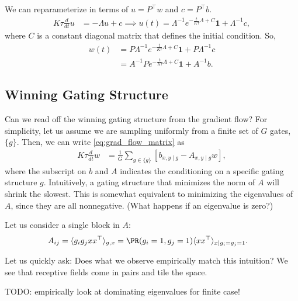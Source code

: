 \documentclass{article}
\begin{document}
We can reparameterize in terms of $u = P^\top w$ and $c = P^\top b$.
\begin{align}
  K \tau \frac{d}{dt} u &= - \Lambda u + c
  \implies
  u(t) = \Lambda^{-1} e^{ -\frac{t}{K \tau} \Lambda + C } \mathbf{1} + \Lambda^{-1} c,
\end{align}
where $C$ is a constant diagonal matrix that defines the initial condition.
So,
\begin{align}
  w(t) 
  &= P \Lambda^{-1} e^{ -\frac{t}{K \tau} \Lambda + C } \mathbf{1} + P \Lambda^{-1} c \\
  &= A^{-1} P e^{ -\frac{t}{K \tau} \Lambda + C } \mathbf{1} + A^{-1} b. \label{eq:grad_flow_solution}
\end{align}

\subsection{Winning Gating Structure}
Can we read off the winning gating structure from the gradient flow?
For simplicity, let us assume we are sampling uniformly from a finite set of $G$ gates, $\{ g \}$.
Then, we can write \cref{eq:grad_flow_matrix} as
\begin{align}
  K \tau \frac{d}{dt} w &= \frac{1}{G} \sum_{g \in \{ g \}} \left[ b_{x,y \mid g} - A_{x,y \mid g} w \right],
\end{align}
where the subscript on $b$ and $A$ indicates the conditioning on a specific gating structure $g$.
Intuitively, a gating structure that minimizes the norm of $A$ will shrink the slowest.
This is somewhat equivalent to minimizing the eigenvalues of $A$, since they are all nonnegative.
(What happens if an eigenvalue is zero?)

Let us consider a single block in $A$:
\begin{align}
  A_{ij} &= \langle g_i g_j x x^\top \rangle_{g,x}
  = \PR( g_i = 1, g_j = 1 ) \langle x x^\top \rangle_{x \mid g_i = g_j = 1}.
\end{align}

Let us quickly ask: Does what we observe empirically match this intuition?
We see that receptive fields come in pairs and tile the space.


TODO: empirically look at dominating eigenvalues for finite case!
\end{document}
